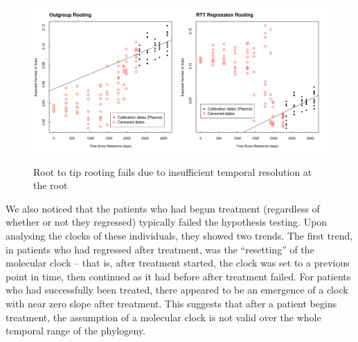 
\begin{figure}[!ht] \label{fig:degenerate_example}
	\centering
	\includegraphics[scale=0.425]{figures/rtt.pdf} \\
	\caption[Example of bad root]{Root to tip rooting fails due to insufficient temporal resolution at the root}
\end{figure}

We also noticed that the patients who had begun treatment (regardless of whether or not they regressed) typically failed the hypothesis testing. Upon analysing the clocks of these individuals, they showed two trends. 
The first trend, in patients who had regressed after treatment, was the ``resetting'' of the molecular clock -- that is, after treatment started, the clock was set to a previous point in time, then continued as it had before after treatment failed. 
For patients who had successfully been treated, there appeared to be an emergence of a clock with near zero slope after treatment.
This suggests that after a patient begins treatment, the assumption of a molecular clock  is not valid over the whole temporal range of the phylogeny. 


